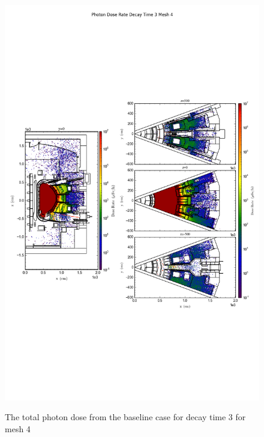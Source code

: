 \begin{figure}[ht!]
\centering
\includegraphics[trim={0cm 9cm 0cm 10cm},clip,scale=0.75]{../plots/final_model/Photon_Dose_Rate_Decay_Time_3_Mesh_4.png}
\label{fig:photons_dc3_no4bc_m4_flux}
\caption{The total photon dose from the baseline case for decay time 3 for mesh 4}
\end{figure}
